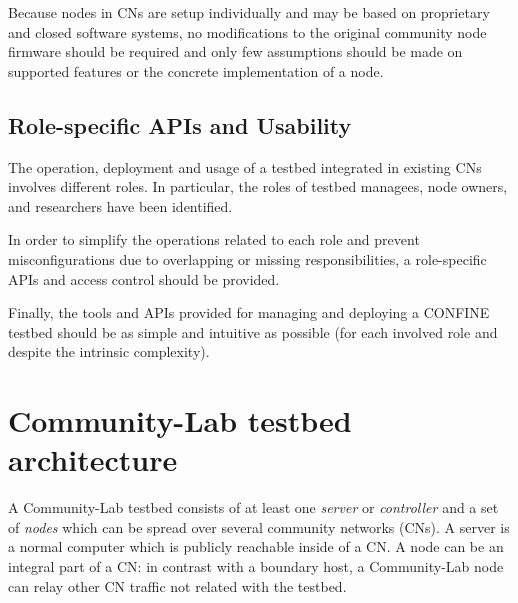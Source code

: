 \documentclass[conference]{IEEEtran}
\begin{document}
Because nodes in CNs are setup individually and may be based on
proprietary and closed software systems, no modifications to the
original community node firmware should be required and only few
assumptions should be made on supported features or the concrete
implementation of a node.


\subsection{Role-specific APIs and Usability}

The operation, deployment and usage of a testbed integrated in
existing CNs involves different roles. In particular, the roles of
testbed managees, node owners, and researchers have been identified.

In order to simplify the operations related to each role and prevent
misconfigurations due to overlapping or missing responsibilities, a
role-specific APIs  and access control should be provided.

Finally, the tools and APIs provided for managing and deploying a
CONFINE testbed should be as simple and intuitive as possible (for
each involved role and despite the intrinsic complexity).







\section{Community-Lab testbed architecture}
\label{sec:confine-architecture}

A Community-Lab testbed consists of at least one \emph{server} or \emph{controller}
and a set of \emph{nodes} which can be spread over several community networks
(CNs).  A server is a normal computer which is publicly reachable inside of a
CN.  A node can be an integral part of a CN: in contrast with a boundary host,
a Community-Lab node can relay other CN traffic not related with the testbed.
\end{document}
